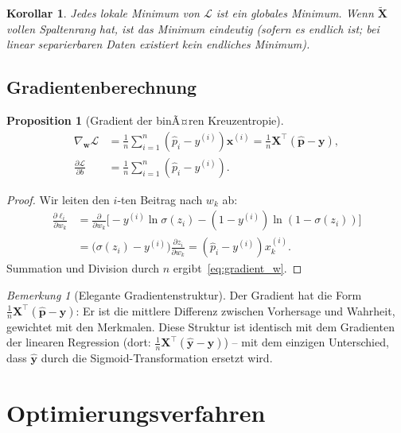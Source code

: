 ﻿\documentclass[12pt, a4paper]{article}
\newtheorem{proposition}[theorem]{Proposition}
\newtheorem{corollary}[theorem]{Korollar}
\theoremstyle{definition}
\theoremstyle{remark}
\newtheorem{remark}[theorem]{Bemerkung}
\newcommand{\sigmoid}{\sigma}
\newcommand{\vw}{\bm{w}}
\newcommand{\vx}{\bm{x}}
\newcommand{\vy}{\bm{y}}
\newcommand{\vX}{\bm{X}}
\newcommand{\vp}{\hat{\bm{p}}}
\newcommand{\T}{\top}
\begin{document}
\begin{corollary}
  Jedes lokale Minimum von $\mathcal{L}$ ist ein globales Minimum. Wenn $\tilde{\vX}$ vollen
  Spaltenrang hat, ist das Minimum eindeutig (sofern es endlich ist; bei linear separierbaren
  Daten existiert kein endliches Minimum).
\end{corollary}

\subsection{Gradientenberechnung}

\begin{proposition}[Gradient der binÃ¤ren Kreuzentropie]
  \begin{align}
    \nabla_{\vw} \mathcal{L} &= \frac{1}{n}\sum_{i=1}^n (\hat{p}_i - y^{(i)})\vx^{(i)}
    = \frac{1}{n}\vX^\T(\vp - \vy),
    \label{eq:gradient_w} \\
    \frac{\partial \mathcal{L}}{\partial b} &= \frac{1}{n}\sum_{i=1}^n (\hat{p}_i - y^{(i)}).
    \label{eq:gradient_b}
  \end{align}
\end{proposition}

\begin{proof}
  Wir leiten den $i$-ten Beitrag nach $w_k$ ab:
  \begin{align*}
    \frac{\partial \ell_i}{\partial w_k}
    &= \frac{\partial}{\partial w_k}\bigl[-y^{(i)}\ln\sigmoid(z_i) - (1-y^{(i)})\ln(1-\sigmoid(z_i))\bigr] \\
    &= \bigl(\sigmoid(z_i) - y^{(i)}\bigr)\frac{\partial z_i}{\partial w_k}
     = (\hat{p}_i - y^{(i)}) x_k^{(i)}.
  \end{align*}
  Summation und Division durch $n$ ergibt~\eqref{eq:gradient_w}. 
\end{proof}

\begin{remark}[Elegante Gradientenstruktur]
  Der Gradient hat die Form $\frac{1}{n}\vX^\T(\vp - \vy)$: Er ist die mittlere Differenz
  zwischen Vorhersage und Wahrheit, gewichtet mit den Merkmalen. Diese Struktur ist identisch
  mit dem Gradienten der linearen Regression (dort: $\frac{1}{n}\vX^\T(\hat{\vy}-\vy)$) --
  mit dem einzigen Unterschied, dass $\hat{\vy}$ durch die Sigmoid-Transformation ersetzt wird.
\end{remark}

\section{Optimierungsverfahren}
\end{document}
